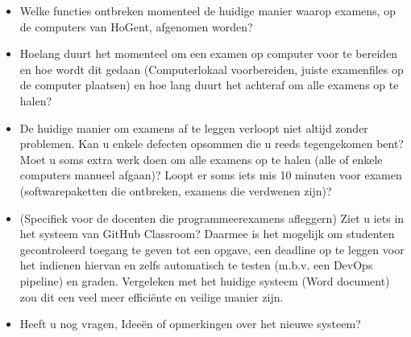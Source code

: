 \begin{itemize}
\begin{itemize}
\end{itemize}	
	\bigskip 
	\item Welke functies ontbreken momenteel de huidige manier waarop examens, op de computers van HoGent, afgenomen worden?
	\bigskip 
	\item Hoelang duurt het momenteel om een examen op computer voor te bereiden en hoe wordt dit gedaan (Computerlokaal voorbereiden, juiste examenfiles op de computer plaatsen) en hoe lang duurt het achteraf om alle examens op te halen?
	\bigskip 
	\item De huidige manier om examens af te leggen verloopt niet altijd zonder problemen. Kan u enkele defecten opsommen die u reeds tegengekomen bent? Moet u soms extra werk doen om alle examens op te halen (alle of enkele computers manueel afgaan)? Loopt er soms iets mis 10 minuten voor examen (softwarepaketten die ontbreken, examens die verdwenen zijn)? 
	\bigskip
	\item (Specifiek voor de docenten die programmeerexamens afleggern) Ziet u iets in het systeem van GitHub Classroom? Daarmee is het mogelijk om studenten gecontroleerd toegang te geven tot een opgave, een deadline op te leggen voor het indienen hiervan en zelfs automatisch te testen (m.b.v. een DevOps pipeline) en graden. Vergeleken met het huidige systeem (Word document) zou dit een veel meer efficiënte en veilige manier zijn.
	\bigskip 
	\item Heeft u nog vragen, Ideeën of opmerkingen over het nieuwe systeem?
	
\end{itemize}

